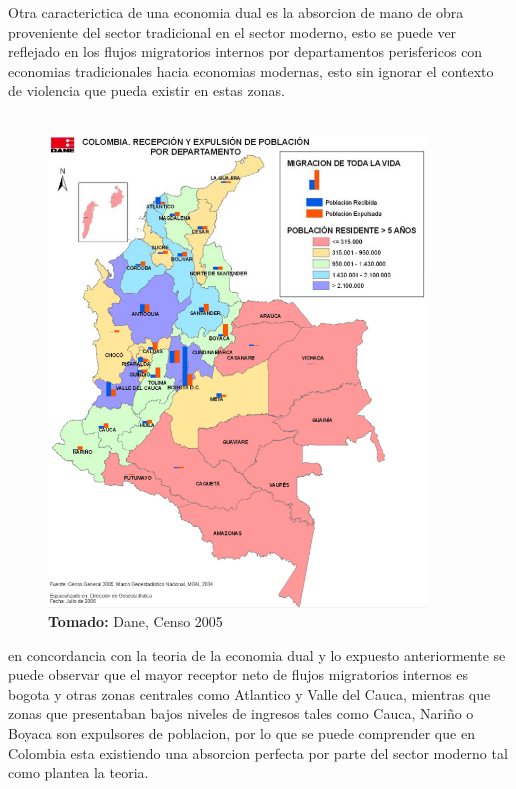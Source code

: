 \documentclass[12pt,letterpaper]{book}
\newcommand*{\captionsource}[2]{%
    \textbf{\\Tomado:} #2%
  }%
\begin{document}
\begin{flushleft}

Otra caracterictica de una economia dual es la absorcion de mano de obra proveniente del sector tradicional en el sector moderno, esto se puede 
ver reflejado en los flujos migratorios internos por departamentos perisfericos con economias tradicionales hacia economias modernas, esto sin ignorar el contexto de violencia que pueda existir en estas zonas.\\
~\\
\begin{figure}
    \centering
    \includegraphics[width=10cm]{flujos.png}
    \captionsource{Caption}{Dane, Censo 2005}
\end{figure}

en concordancia con la teoria de la economia dual y lo expuesto anteriormente se puede observar que el mayor receptor neto de flujos migratorios internos
 es bogota y otras zonas centrales como Atlantico y Valle del Cauca, mientras que zonas que presentaban bajos niveles de ingresos tales como Cauca, Nariño o Boyaca son expulsores de poblacion, 
 por lo que se puede comprender que en Colombia esta existiendo una absorcion perfecta por parte del sector moderno tal como plantea la teoria.
\end{flushleft}
\end{document}
